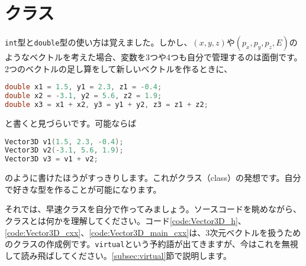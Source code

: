 \clearpage

\section{クラス}
\texttt{int}型と\texttt{double}型の使い方は覚えました。しかし、$(x, y, z)$や$(p_x, p_y, p_z, E)$のようなベクトルを考えた場合、変数を3つや4つも自分で管理するのは面倒です。2つのベクトルの足し算をして新しいベクトルを作るときに、
\begin{lstlisting}[language=c++]
double x1 = 1.5, y1 = 2.3, z1 = -0.4;
double x2 = -3.1, y2 = 5.6, z2 = 1.9;
double x3 = x1 + x2, y3 = y1 + y2, z3 = z1 + z2;
\end{lstlisting}
と書くと見づらいです。可能ならば
\begin{lstlisting}[language=c++]
Vector3D v1(1.5, 2.3, -0.4);
Vector3D v2(-3.1, 5.6, 1.9);
Vector3D v3 = v1 + v2;
\end{lstlisting}
のように書けたほうがすっきりします。これがクラス（class）の発想です。自分で好きな型を作ることが可能になります。

それでは、早速クラスを自分で作ってみましょう。ソースコードを眺めながら、クラスとは何かを理解してください。コード\ref{code:Vector3D_h}、\ref{code:Vector3D_cxx}、\ref{code:Vector3D_main_cxx}は、3次元ベクトルを扱うためのクラスの作成例です。\texttt{virtual}という予約語が出てきますが、今はこれを無視して読み飛ばしてください。\ref{subsec:virtual}節で説明します。

\begin{NoFloat}

\end{NoFloat}
\begin{NoFloat}

\end{NoFloat}
\begin{NoFloat}

\end{NoFloat}

